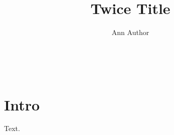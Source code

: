 \documentclass{article}
\title{Twice Title}\author{Ann Author}
\begin{document}
\begin{center}\@title\ \@title\end{center}
\maketitle
\section{Intro}
Text.
\end{document}
